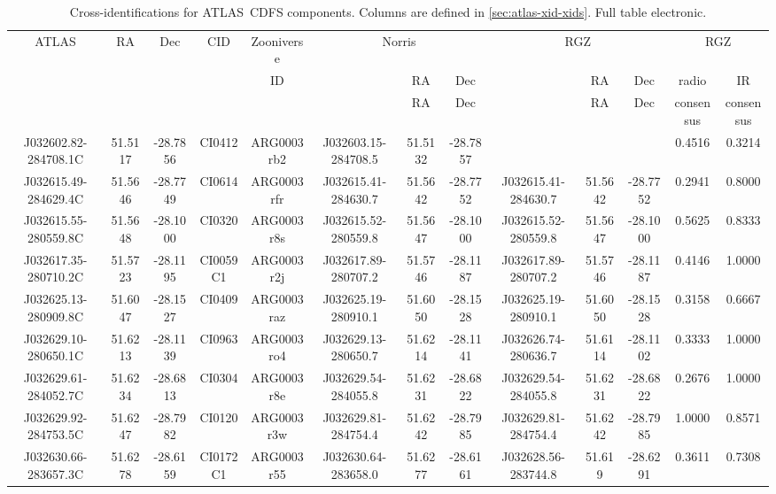   \begin{table}
    \caption[Cross-identifications for ATLAS~CDFS components.]{Cross-identifications for ATLAS~CDFS components. Columns are defined in \autoref{sec:atlas-xid-xids}. Full table electronic.}
    \label{tab:cdfs-xids}
    \tiny\centering
    \begin{tabular}{ccccccccccccc}
      \hline\hline
ATLAS & RA & Dec & CID & Zooniverse & \multicolumn{3}{c}{Norris} & \multicolumn{3}{c}{RGZ} & \multicolumn{2}{c}{RGZ}\\
 & & & & ID & & RA & Dec & & RA & Dec & radio & IR \\
 & & & & & & RA & Dec & & RA & Dec & consensus & consensus\\
      \hline
J032602.82-284708.1C & 51.5117 & -28.7856 & CI0412 & ARG0003rb2 & J032603.15-284708.5 & 51.5132 & -28.7857 &  &  &  & 0.4516 & 0.3214 \\
J032615.49-284629.4C & 51.5646 & -28.7749 & CI0614 & ARG0003rfr & J032615.41-284630.7 & 51.5642 & -28.7752 & J032615.41-284630.7 & 51.5642 & -28.7752 & 0.2941 & 0.8000 \\
J032615.55-280559.8C & 51.5648 & -28.1000 & CI0320 & ARG0003r8s & J032615.52-280559.8 & 51.5647 & -28.1000 & J032615.52-280559.8 & 51.5647 & -28.1000 & 0.5625 & 0.8333 \\
J032617.35-280710.2C & 51.5723 & -28.1195 & CI0059C1 & ARG0003r2j & J032617.89-280707.2 & 51.5746 & -28.1187 & J032617.89-280707.2 & 51.5746 & -28.1187 & 0.4146 & 1.0000 \\
J032625.13-280909.8C & 51.6047 & -28.1527 & CI0409 & ARG0003raz & J032625.19-280910.1 & 51.6050 & -28.1528 & J032625.19-280910.1 & 51.6050 & -28.1528 & 0.3158 & 0.6667 \\
J032629.10-280650.1C & 51.6213 & -28.1139 & CI0963 & ARG0003ro4 & J032629.13-280650.7 & 51.6214 & -28.1141 & J032626.74-280636.7 & 51.6114 & -28.1102 & 0.3333 & 1.0000 \\
J032629.61-284052.7C & 51.6234 & -28.6813 & CI0304 & ARG0003r8e & J032629.54-284055.8 & 51.6231 & -28.6822 & J032629.54-284055.8 & 51.6231 & -28.6822 & 0.2676 & 1.0000 \\
J032629.92-284753.5C & 51.6247 & -28.7982 & CI0120 & ARG0003r3w & J032629.81-284754.4 & 51.6242 & -28.7985 & J032629.81-284754.4 & 51.6242 & -28.7985 & 1.0000 & 0.8571 \\
J032630.66-283657.3C & 51.6278 & -28.6159 & CI0172C1 & ARG0003r55 & J032630.64-283658.0 & 51.6277 & -28.6161 & J032628.56-283744.8 & 51.619 & -28.6291 & 0.3611 & 0.7308 \\

\end{tabular}
\end{table}
